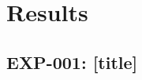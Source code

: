 %
%
%

\section{Results}
\label{sec:results}


\subsection{EXP-001: [title]}
\label{sec:results-exp001}

